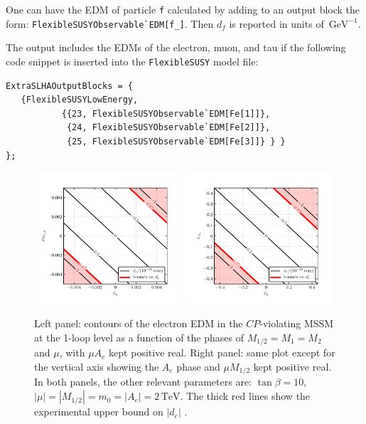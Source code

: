 \documentclass[final,3p,11pt,pdflatex]{elsarticle}
\makeatletter
\newcommand{\fs}{\texttt{FlexibleSUSY}\@\xspace}
\newcommand{\code}[1]{\lstinline|#1|}  %
\newcommand{\unit}[1]{\,\text{#1}}      %
\newcommand{\edm}[1]{\ensuremath{d_{#1}}\xspace}
\newcommand{\CP}{\ensuremath{CP}\xspace}
\newcommand{\mhalf}{\ensuremath{M_{1/2}}\xspace}
\newcommand{\mzero}{\ensuremath{m_0}\xspace}
\makeatother
\begin{document}
One can have the EDM of particle \code{f} calculated
by adding to an output block the form: \code{FlexibleSUSYObservable`EDM[f_]}.
Then $\edm{f}$ is reported in units of $\unit{GeV}^{-1}$.
\begin{example}
The output includes
the EDMs of the electron, muon, and tau if
the following code snippet is inserted into the \fs model file:
\begin{lstlisting}
ExtraSLHAOutputBlocks = {
   {FlexibleSUSYLowEnergy,
           {{23, FlexibleSUSYObservable`EDM[Fe[1]]},
            {24, FlexibleSUSYObservable`EDM[Fe[2]]},
            {25, FlexibleSUSYObservable`EDM[Fe[3]]} } }
};
\end{lstlisting}
\end{example}

\begin{figure}
  \centering
  \includegraphics[width=0.49\textwidth]{plots/MSSMCPV/contour_de_PhiMuM12}\hfill
  \includegraphics[width=0.49\textwidth]{plots/MSSMCPV/contour_de_PhiMuTe}
  \caption{Left panel: contours of the electron EDM in the
    \CP-violating MSSM at the 1-loop level as a function of
    the phases of $\mhalf = M_1 = M_2$ and $\mu$,
    with $\mu A_e$ kept positive real.
    Right panel: same plot except for the vertical axis showing
    the $A_e$ phase and $\mu \mhalf$ kept positive real.
    In both panels, the other relevant parameters are:
    $\tan\beta = 10$, $|\mu| = |\mhalf| = \mzero = |A_e| = 2\unit{TeV}$.
    The thick red lines show the experimental upper bound on $|\edm{e}|$
    \cite{Baron:2013eja}.}
  \label{fig:EDM plots}
\end{figure}
\end{document}
